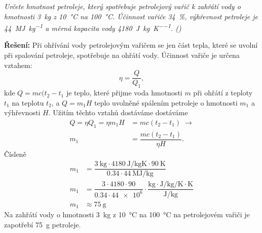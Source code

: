 \begin{mdframed}[style=mdexam]
  \begin{example}\label{FYZ:exam029}
    \emph{Určete hmotnost petroleje, který spotřebuje petrolejový vařič k zahřátí vody o hmotnosti
    \SI{3}{\kg} z \SI{10}{\degreeCelsius} na \SI{100}{\degreeCelsius}. Účinnost vařiče
    \SI{34}{\percent}, výhřevnost petroleje je \SI{44}{\mega\joule\per\kg} a měrná kapacita vody
    \SI{4180}{\joule\per\kg\per\kelvin}. (\cite[s.~31]{Bartuska1997})}
    

    {\centering
    \captionsetup{type=figure}
    \par} 
    
    \textbf{Řešení:}\newline 
    Při ohřívání vody petrolejovým vařičem se jen část tepla, které se uvolní při spalování
    petroleje, spotřebuje na ohřátí vody. Účinnost vařiče je určena vztahem:
    \begin{equation*}
      \eta = \dfrac{Q}{Q_1},
    \end{equation*}
    kde \(Q = mc(t_2 - t_1\) je teplo, které přijme voda  hmotnosti \(m\) při ohřátí z teploty
    \(t_1\) na teplotu \(t_2\), a \(Q=m_1H\) teplo uvolněné spálením petroleje o hmotnosti \(m_1\)
    a výhřevnosti \(H\). Užitím těchto vztahů dostáváme
    dostáváme
    \begin{align*}
     Q = \eta Q_1 = \eta m_1H &= mc(t_2-t_1) \;\rightarrow  \\
                               m_1 &= \dfrac{mc(t_2-t_1)}{\eta H}.
    \end{align*}
    Čísleně 
    \begin{align*}
       m_1 &= \dfrac{\SI{3}{\kg}\cdot\SI{4180}{\joule\per\kg\kelvin}\cdot\SI{90}{\kelvin}}
                    {\num{0.34}\cdot\SI{44}{\mega\joule\per\kg}}                                  \\
       m_1 &= \dfrac{3\cdot4180\cdot90}{\num{0.34}\cdot\num{44e6}}\cdot
              \dfrac{\si{\kg}\cdot\si{\joule\per\kg\per\kelvin}\cdot\si{\kelvin}}
                    {\si{\J\per\kg}}                                                              \\
       m_1 &\approx \SI{75}{\g}    
     \end{align*}
     Na zahřátí vody o hmotnosti \SI{3}{\kg} z \SI{10}{\degreeCelsius} na \SI{100}{\degreeCelsius}
     na petrolejovém vařiči je zapotřebí \SI{75}{\g} petroleje.
  \end{example} 
\end{mdframed}